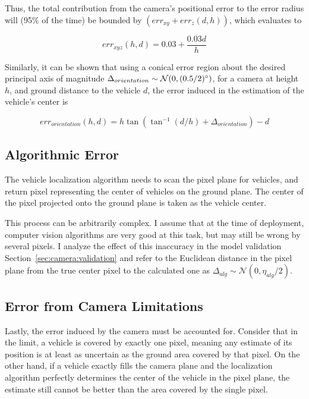 \documentclass[a4paper,12pt,twoside,openright]{report}
\begin{document}
Thus, the total contribution from the camera's positional error to the error radius
will (95\% of the time) be bounded by $(err_{xy} + err_{z}(d, h))$, which evaluates to

\[ err_{xyz}(h, d) = 0.03 + \frac{0.03d}{h} \]

Similarly, it can be shown that using a conical error region about the desired principal axis
of magnitude $\Delta_{orientation} \sim \mathcal{N}(0,(0.5/2)\degree)$, 
for a camera at height $h$, and ground distance to the vehicle $d$, the
error induced in the estimation of the vehicle's center is 

\[ err_{orientation}(h, d) = h\tan(\tan^{-1}(d/h) + \Delta_{orientation}) - d \] %




\subsection{Algorithmic Error}

The vehicle localization algorithm needs to scan the pixel plane for vehicles,
and return pixel representing the center of vehicles on the ground plane.
The center of the pixel projected onto the ground plane is taken as the vehicle center.

This process can be arbitrarily complex. I assume that at the time of deployment, 
computer vision algorithms are very good at this task, but may still
be wrong by several pixels. I analyze the effect of this inaccuracy
in the model validation Section~\ref{sec:camera:validation} and refer to the Euclidean distance
in the pixel plane from the true center pixel to the calculated one
as $\Delta_{alg} \sim \mathcal{N}(0, \eta_{alg}/2)$.

\subsection{Error from Camera Limitations}

Lastly, the error induced by the camera must be accounted for. Consider that 
in the limit, a vehicle is covered by exactly one pixel, meaning any estimate
of its position is at least as uncertain as the ground area 
covered by that pixel. On the other hand, if a vehicle
exactly fills the camera plane and the localization algorithm perfectly determines
the center of the vehicle in the pixel plane, the estimate still cannot
be better than the area covered by the single pixel.
\end{document}
